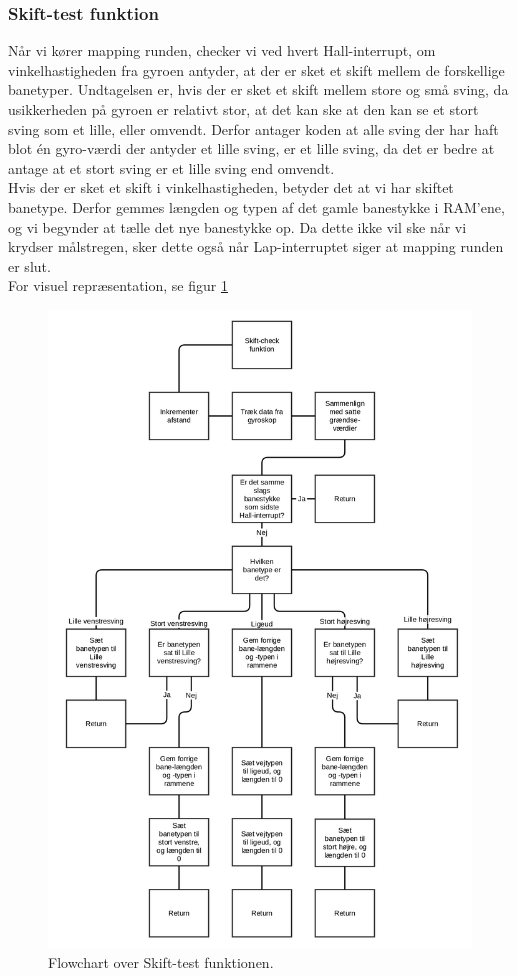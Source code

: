 \subsubsection{Skift-test funktion}
\label{Skift funktion}

Når vi kører mapping runden, checker vi ved hvert Hall-interrupt, om vinkelhastigheden fra gyroen antyder, at der er sket et skift mellem de forskellige banetyper. Undtagelsen er, hvis der er sket et skift mellem store og små sving, da usikkerheden på gyroen er relativt stor, at det kan ske at den kan se et stort sving som et lille, eller omvendt. Derfor antager koden at alle sving der har haft blot én gyro-værdi der antyder et lille sving, er et lille sving, da det er bedre at antage at et stort sving er et lille sving end omvendt. 
\\
Hvis der er sket et skift i vinkelhastigheden, betyder det at vi har skiftet banetype. Derfor gemmes længden og typen af det gamle banestykke i RAM'ene, og vi begynder at tælle det nye banestykke op. Da dette ikke vil ske når vi krydser målstregen, sker dette også når Lap-interruptet siger at mapping runden er slut.
\\
For visuel repræsentation, se figur \ref{fig:Skift Flowchart}

\begin{figure}[hbtp]
\centering
\includegraphics[scale=0.12]{Billeder/skift_check.png}
\caption{Flowchart over Skift-test funktionen.}
\label{fig:Skift Flowchart}
\end{figure}
